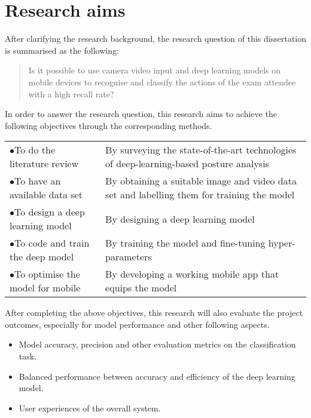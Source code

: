\section{Research aims}
\label{sec:Research aims}
After clarifying the research background, the research question of this dissertation is summarised as the following:

\begin{quote}
    Is it possible to use camera video input and deep learning models on mobile devices to recognise and classify the actions of the exam attendee with a high recall rate?
\end{quote}

In order to answer the research question, this research aims to achieve the following objectives through the corresponding methods.

\begin{longtable}{>{\hspace*{-0.3cm}$\bullet$\hspace*{0.2cm}}p{}p{}}
To do the literature review & By surveying the state-of-the-art technologies of deep-learning-based posture analysis \\
To have an available data set & By obtaining a suitable image and video data set and labelling them for training the model \\
To design a deep learning model & By designing a deep learning model \\
To code and train the deep model & By training the model and fine-tuning hyper-parameters \\
To optimise the model for mobile & By developing a working mobile app that equips the model \\
\end{longtable}

After completing the above objectives, this research will also evaluate the project outcomes, especially for model performance and other following aspects.

\begin{itemize}
    \item Model accuracy, precision and other evaluation metrics on the classification task.
    \item Balanced performance between accuracy and efficiency of the deep learning model.
    \item User experiences of the overall system.
\end{itemize}
